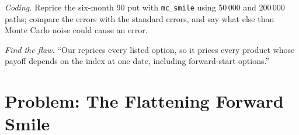 \begin{exercise}[$\star\star\star$]\label{exo:dv:local-volatility:7}
\emph{Coding.} Reprice the six-month 90 put with \texttt{mc\_smile} using 50\,000 and 200\,000 paths; compare the
errors with the standard errors, and say what else than Monte Carlo noise could cause an error.
\end{exercise}

\begin{exercise}[$\star\star\star$]\label{exo:dv:local-volatility:8}
\emph{Find the flaw.} ``Our  reprices every listed option, so it prices every product whose
payoff depends on the index at one date, including forward-start options.''
\end{exercise}

\section{Problem: The Flattening Forward Smile}

